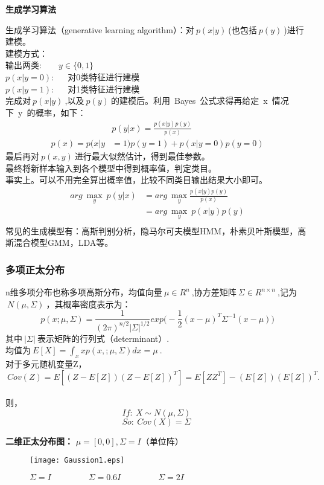 \noindent\textbf{生成学习算法}\par
生成学习算法（generative learning algorithm）：对$~p(x|y)~$(也包括$~p(y)~$)进行建模。\\
建模方式：\\
输出两类:~~~~$y\in\{0,1\}$\\
$p(x|y=0):$~~~对0类特征进行建模\\
$p(x|y=1):$~~~对1类特征进行建模\\
完成对$~p(x|y)~$,以及$~p(y)~$的建模后。利用~Bayes~公式求得再给定~x~情况下~y~的概率，如下：
\begin{equation}\nonumber
\begin{split}
  &p(y|x)=\frac{p(x|y)p(y)}{p(x)}\\
  p(x)=p(x|y&=1)p(y=1)+p(x|y=0)p(y=0)
\end{split}
\end{equation}
最后再对$~p(x,y)~$进行最大似然估计，得到最佳参数。\\
最终将新样本输入到各个模型中得到概率值，判定类目。\\
事实上。可以不用完全算出概率值，比较不同类目输出结果大小即可。
\begin{equation}\nonumber
\begin{split}
  arg~\mathop{max}_y~p(y|x)&=arg~\mathop{max}_y\frac{p(x|y)p(y)}{p(x)}\\
  &=arg~\mathop{max}_y~p(x|y)p(y)\\
\end{split}
\end{equation}
常见的生成模型有：高斯判别分析，隐马尔可夫模型HMM，朴素贝叶斯模型，高斯混合模型GMM，LDA等。

\subsubsection{多项正太分布}
n维多项分布也称多项高斯分布，均值向量$~\mu\in R^n~$,协方差矩阵$~\Sigma\in R^{n\times n}~$,记为$~N(\mu,\Sigma)~$，其概率密度表示为：$$p(x;\mu,\Sigma)=\frac{1}{(2\pi)^{n/2}|\Sigma|^{1/2}}exp\Big(-\frac{1}{2}(x-\mu)^T\Sigma^{-1}(x-\mu)\Big)$$
其中$~|\Sigma|~$表示矩阵的行列式（determinant）.\\
均值为$~E[X]=\displaystyle \int_xxp(x,;\mu,\Sigma)dx=\mu~$.\\
对于多元随机变量Z，$$~Cov(Z)=E[(Z-E[Z])(Z-E[Z])^T]=E[ZZ^T]-(E[Z])(E[Z])^T.~$$\\
则，$$If:~X\sim N(\mu,\Sigma)~$$$$So:~Cov(X)=\Sigma~$$

\noindent\textbf{二维正太分布图：} $\mu=[0,0],\Sigma=I$（单位阵）
\begin{figure}[!h]
  \centering
  \texttt{[image: Gaussion1.eps]}
  \caption{$\Sigma=I~~~~~~~~~~~~~~~~~~~~\Sigma=0.6I~~~~~~~~~~~~~~~~~~~~\Sigma=2I$}
\end{figure}

